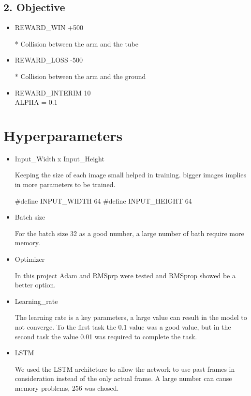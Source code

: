 \documentclass[12pt]{extarticle}
\begin{document}
\subsection{2. Objective}


\begin{itemize}
  \item REWARD\_WIN +500
    
    * Collision between the arm and the tube
  \item REWARD\_LOSS -500

    * Collision between the arm and the ground
   \item REWARD\_INTERIM 10 \\ ALPHA = 0.1

\end{itemize}


\section{Hyperparameters}


\begin{itemize}
  \item Input\_Width x Input\_Height

    Keeping the size of each image small helped in training. bigger images implies in more parameters to be trained.
      
    #define INPUT\_WIDTH 64
    #define INPUT\_HEIGHT 64
  \item Batch size

    For the batch size 32 as a good number, a large number of bath require more memory.

  \item Optimizer

    In this project Adam and RMSprp were tested and RMSprop showed be a better option.
  \item Learning\_rate

    The learning rate is a key parameters, a large value can result in the model to not converge. 
    To the first task the 0.1 value was a good value, but in the second task the value 0.01 was required to complete the
    task.

  \item LSTM
    
    We used the LSTM architeture to allow the network to use past frames in consideration instead of the only actual
    frame.
    A large number can cause memory problems, 256 was chosed.


\end{itemize}
\end{document}
